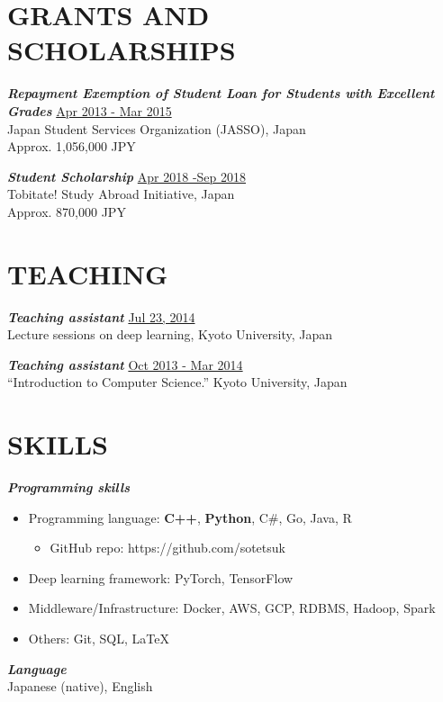 \documentclass[margin, 10pt]{res} %
\begin{document}
\begin{resume}
\section{{\small GRANTS AND\\SCHOLARSHIPS}}
{\sl {\bf Repayment Exemption of Student Loan for Students with Excellent Grades}} \hfill {\small \underline{Apr 2013 - Mar 2015}} \\
Japan Student Services Organization (JASSO), Japan \\
Approx. 1,056,000 JPY

{\sl {\bf Student Scholarship}} \hfill {\small \underline{Apr 2018 -Sep 2018}} \\
Tobitate! Study Abroad Initiative, Japan \\
Approx. 870,000 JPY

\section{{\small TEACHING}}
{\sl {\bf Teaching assistant}} \hfill {\small \underline{Jul 23, 2014}} \\
Lecture sessions on deep learning, Kyoto University, Japan

{\sl {\bf Teaching assistant}} \hfill {\small \underline{Oct 2013 - Mar 2014}} \\
``Introduction to Computer Science.'' Kyoto University, Japan

\section{{\small SKILLS}}
{\sl {\bf Programming skills}} \vspace{0.5em}
\begin{itemize}
\item Programming language: {\bf C++}, {\bf Python}, C\#, Go, Java, R
  \begin{itemize}
  \item GitHub repo: https://github.com/sotetsuk
  \end{itemize}
\item Deep learning framework: PyTorch, TensorFlow
\item Middleware/Infrastructure: Docker, AWS, GCP, RDBMS, Hadoop, Spark
\item Others: Git, SQL, LaTeX
\end{itemize}

{\sl {\bf Language}}\\
Japanese (native), English

\end{resume}
\end{document}
